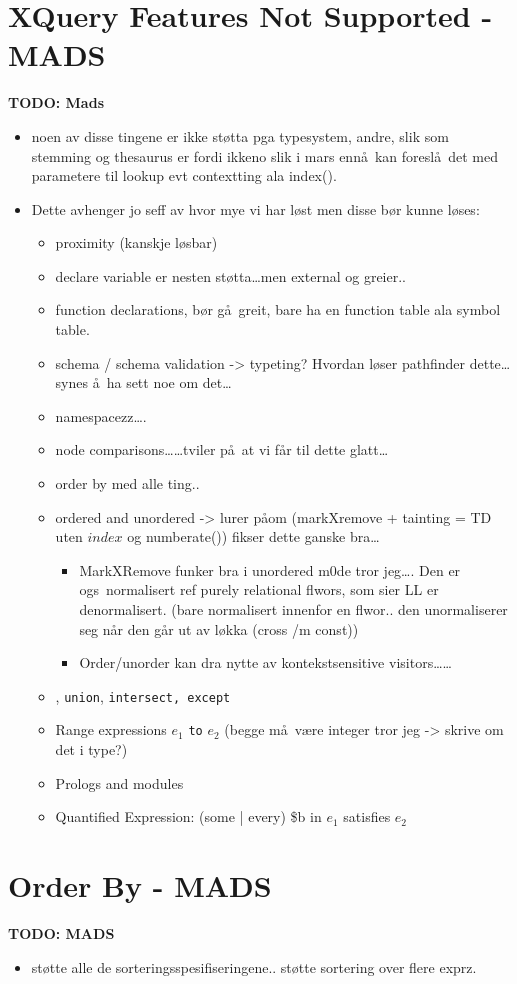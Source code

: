\section{XQuery Features Not Supported - {MADS}}
\label{sect:disc:notSupported}
\textbf{\LARGE TODO: Mads}
\begin{itemize}
\item noen av disse tingene er ikke st\o tta pga typesystem, andre, slik som stemming og thesaurus er fordi ikkeno
slik i mars enn\aa~kan foresl\aa~det med parametere til lookup evt contextting ala \textsf{index()}.
  \item Dette avhenger jo seff av hvor mye vi har l\o st men disse b\o r kunne
  l\o ses:
  	\begin{itemize}
  		\item proximity (kanskje l\o sbar)
  		\item declare variable er nesten st\o tta\ldots men external og greier..
  		\item function declarations, b\o r g\aa~greit, bare ha en function table ala symbol table.
  		\item schema / schema validation -> typeting? Hvordan l\o ser pathfinder dette\ldots synes \aa~ha sett noe om
  		det\ldots
  		\item namespacezz\ldots.
  		\item node comparisons\ldots\ldots tviler p\aa~at vi f\aa r til dette glatt\ldots
  		\item order by med alle ting..
  		\item ordered and unordered -> lurer p\aa om (markXremove + tainting = TD uten $index$ og
  		\textsf{numberate()}) fikser dette ganske bra\ldots
  		\begin{itemize}
			\item MarkXRemove funker bra i unordered m0de tror jeg\ldots. Den er ogs\a~normalisert ref purely relational
			flwors, som sier LL er denormalisert. (bare normalisert innenfor en flwor.. den unormaliserer seg n\aa r den
			g\aa r ut av l\o kka (cross /m const))
			\item Order/unorder kan dra nytte av kontekstsensitive visitors\ldots\ldots
		\end{itemize}
  		\item \textbar, \texttt{union}, \texttt{intersect, except}
  		\item Range expressions $e_1$ \texttt{to} $e_2$ (begge m\aa~v\ae re integer tror jeg -> skrive om det i type?)
  		\item Prologs and modules
  		\item Quantified Expression: (some | every) \$b in $e_1$ satisfies $e_2$
  		\end{itemize}
	\end{itemize}

\section{Order By - {MADS}}
\label{sect:disc:orderby}
\textbf{\LARGE TODO: {MADS}}
\begin{itemize}
  \item st\o tte alle de sorteringsspesifiseringene.. st\o tte sortering over flere exprz.
\end{itemize}
	